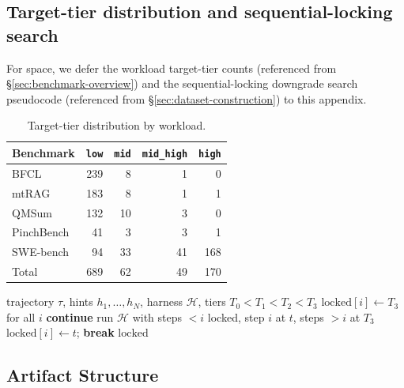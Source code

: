 \subsection{Target-tier distribution and sequential-locking search}
\label{app:tier-alg}

For space, we defer the workload target-tier counts (referenced from
\S\ref{sec:benchmark-overview}) and the sequential-locking downgrade search
pseudocode (referenced from \S\ref{sec:dataset-construction}) to this appendix.

\begin{table}[ht]
\centering
\small
\begin{tabular}{lrrrr}
\toprule
Benchmark & \texttt{low} & \texttt{mid} & \texttt{mid\_high} & \texttt{high} \\
\midrule
BFCL       & 239 & 8  & 1  & 0 \\
mtRAG      & 183 & 8  & 1  & 1 \\
QMSum      & 132 & 10 & 3  & 0 \\
PinchBench & 41  & 3  & 3  & 1 \\
SWE-bench  & 94  & 33 & 41 & 168 \\
\midrule
Total      & 689 & 62 & 49 & 170 \\
\bottomrule
\end{tabular}
\caption{Target-tier distribution by workload.}
\label{tab:tier-distribution}
\end{table}

\begin{algorithm}[ht]
\caption{Sequential-locking downgrade search (per trajectory)}
\label{alg:seq-lock}
\scriptsize
\begin{algorithmic}[1]
\REQUIRE trajectory $\tau$, hints $h_1,\ldots,h_N$, harness $\mathcal{H}$, tiers $T_0<T_1<T_2<T_3$
\STATE $\text{locked}[i]\leftarrow T_3$ for all $i$
    \STATE \textbf{continue}
  \ENDIF
    \STATE run $\mathcal{H}$ with steps $<i$ locked, step $i$ at $t$, steps $>i$ at $T_3$
      \STATE $\text{locked}[i]\leftarrow t$; \textbf{break}
    \ENDIF
  \ENDFOR
\ENDFOR
\RETURN $\text{locked}$
\end{algorithmic}
\end{algorithm}

\subsection{Artifact Structure}
\label{app:artifact}

